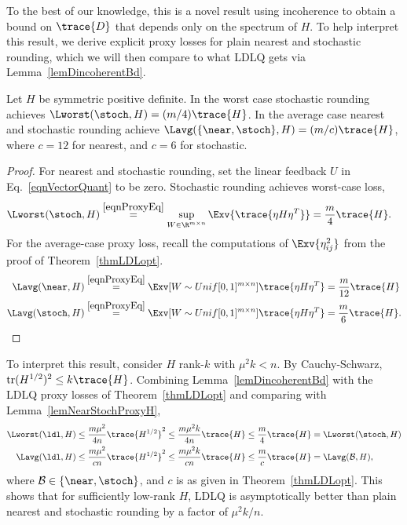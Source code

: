 To the best of our knowledge, this is a novel result  using incoherence to obtain a bound on $\trace{D}$ that depends only on the spectrum of $H$.
To help interpret this result, we derive explicit proxy losses for plain nearest and stochastic rounding, which we will then compare to what LDLQ gets via Lemma~\ref{lemDincoherentBd}.


\begin{lemmarep}\label{lemNearStochProxyH}
Let $H$ be symmetric positive definite.
In the worst case stochastic rounding achieves $\Lworst(\stoch, H) = (m/4) \trace{H}$.
In the average case nearest and stochastic rounding achieve $\Lavg(\{\near, \stoch\}, H) = (m/c) \trace{H}$, where $c=12$ for nearest, and $c=6$ for stochastic.
\end{lemmarep}
\begin{proof}
For nearest and stochastic rounding, set the linear feedback $U$ in Eq.~\eqref{eqnVectorQuant} to be zero.
Stochastic rounding achieves worst-case loss,
\begin{align}
    \Lworst(\stoch, H)
    &\stackrel{\eqref{eqnProxyEq}}{=}
    \sup_{W \in \R^{m \times n}} \Exv{ \trace{ \eta H \eta^T } }
    = \frac m4 \trace{ H }.
    \label{eqnThm3proofb}
\end{align}
For the average-case proxy loss, recall the computations of $\Exv{ \eta_{ij}^2 }$ from the proof of Theorem~\ref{thmLDLopt}.
\begin{align}
    \Lavg(\near, H)
    &\stackrel{\eqref{eqnProxyEq}}{=}
    \Exv[{W \sim Unif[0,1]^{m \times n}}]{ \trace{ \eta H \eta^T } }
    = \frac{m}{12} \trace{ H } 
    \label{eqnThm3proofc}\\
    \Lavg(\stoch, H)
    &\stackrel{\eqref{eqnProxyEq}}{=}
    \Exv[{W \sim Unif[0,1]^{m \times n}}]{ \trace{ \eta H \eta^T } }
    = \frac m6 \trace{ H }.
    \label{eqnThm3proofd}
\end{align}
\end{proof}


To interpret this result, consider $H$ rank-$k$ with $\mu^2 k < n$.
By Cauchy-Schwarz, $\operatorname{tr}( H^{1/2} )^2 \leq k \trace{ H }$. Combining Lemma~\ref{lemDincoherentBd} with the LDLQ proxy losses of Theorem~\ref{thmLDLopt} and comparing with Lemma~\ref{lemNearStochProxyH},
{\small\begin{align*}
   \Lworst(\ldl, H) 
   &\leq 
   \frac{m \mu^2}{4n} \trace{ H^{1/2} }^2 
   \le
   \frac{m \mu^2 k}{4n} \trace{H}
   \leq
   \frac{m}{4} \trace{H}
   =
   \Lworst(\stoch, H) \\
   \Lavg(\ldl, H) 
   &\leq 
   \frac{m \mu^2}{cn} \trace{ H^{1/2} }^2 
   \le
   \frac{m \mu^2 k}{cn} \trace{ H } 
   \leq 
   \frac{m}{c} \trace{H}
   =
   \Lavg(\mathcal{B}, H),
\end{align*}}%
where $\mathcal{B} \in \{\near, \stoch\}$, and $c$ is as given in Theorem~\ref{thmLDLopt}.
This shows that for sufficiently low-rank $H$, LDLQ is asymptotically better than plain nearest and stochastic rounding by a factor of $\mu^2 k / n$.


